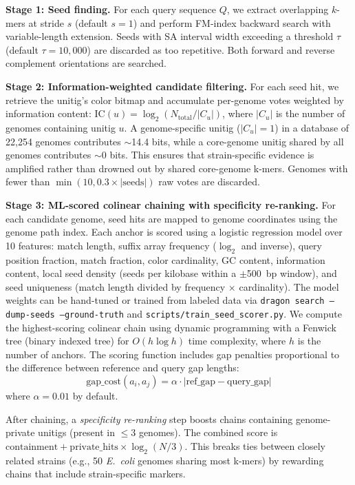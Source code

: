 \documentclass[11pt]{article}
\begin{document}
\textbf{Stage 1: Seed finding.} For each query sequence $Q$, we extract overlapping $k$-mers at stride $s$ (default $s=1$) and perform FM-index backward search with variable-length extension. Seeds with SA interval width exceeding a threshold $\tau$ (default $\tau = 10{,}000$) are discarded as too repetitive. Both forward and reverse complement orientations are searched.

\textbf{Stage 2: Information-weighted candidate filtering.} For each seed hit, we retrieve the unitig's color bitmap and accumulate per-genome votes weighted by information content: $\text{IC}(u) = \log_2(N_{\text{total}} / |C_u|)$, where $|C_u|$ is the number of genomes containing unitig $u$. A genome-specific unitig ($|C_u| = 1$) in a database of 22{,}254 genomes contributes $\sim$14.4 bits, while a core-genome unitig shared by all genomes contributes $\sim$0 bits. This ensures that strain-specific evidence is amplified rather than drowned out by shared core-genome k-mers. Genomes with fewer than $\min(10, 0.3 \times |\text{seeds}|)$ raw votes are discarded.

\textbf{Stage 3: ML-scored colinear chaining with specificity re-ranking.} For each candidate genome, seed hits are mapped to genome coordinates using the genome path index. Each anchor is scored using a logistic regression model over 10 features: match length, suffix array frequency ($\log_2$ and inverse), query position fraction, match fraction, color cardinality, GC content, information content, local seed density (seeds per kilobase within a $\pm$500~bp window), and seed uniqueness (match length divided by frequency $\times$ cardinality). The model weights can be hand-tuned or trained from labeled data via \texttt{dragon search --dump-seeds --ground-truth} and \texttt{scripts/train\_seed\_scorer.py}. We compute the highest-scoring colinear chain using dynamic programming with a Fenwick tree (binary indexed tree) for $O(h \log h)$ time complexity, where $h$ is the number of anchors. The scoring function includes gap penalties proportional to the difference between reference and query gap lengths:
\[
\text{gap\_cost}(a_i, a_j) = \alpha \cdot |\text{ref\_gap} - \text{query\_gap}|
\]
where $\alpha = 0.01$ by default.

After chaining, a \emph{specificity re-ranking} step boosts chains containing genome-private unitigs (present in $\leq 3$ genomes). The combined score is $\text{containment} + \text{private\_hits} \times \log_2(N/3)$. This breaks ties between closely related strains (e.g., 50 \textit{E.~coli} genomes sharing most k-mers) by rewarding chains that include strain-specific markers.
\end{document}
